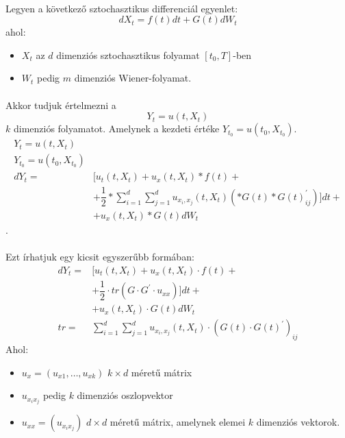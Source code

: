 \documentclass[11pt,a4paper]{article}
\begin{document}
						\paragraph{}
							Legyen a következő sztochasztikus differenciál egyenlet:
							$$d X_t = f(t)dt + G(t) d W_t$$
							ahol:
							\begin{itemize}
								\item $X_t$ az $d$ dimenziós sztochasztikus folyamat $[t_0, T]$-ben
								\item $W_t$ pedig $m$ dimenziós Wiener-folyamat.
							\end{itemize}
						\paragraph{}
							Akkor tudjuk értelmezni a
							$$Y_t = u(t, X_t)$$
							$k$ dimenziós folyamatot. Amelynek a kezdeti értéke $Y_{t_0} =u(t_0,X_{t_0})$.
							$$
							\begin{aligned}
								Y_t = u(t, X_t) \\
								Y_{t_0} =u(t_0,X_{t_0}) \\
								d Y_t = & \bigg[ u_t(t, X_t) + u_x(t,X_t) * f(t) + \\
								&+ \dfrac{1}{2} * \sum_{i=1}^d \sum_{j=1}^d u_{x_i, x_j}(t,X_t)  (*G(t)*G(t)^\prime_{ij})
								\bigg]dt + \\
								&+u_x(t,X_t)*G(t) dW_t
							\end{aligned}
							$$.
						\paragraph{}
							Ezt írhatjuk egy kicsit egyszerűbb formában:
							$$
							\begin{aligned}
								d Y_t = & \bigg[ u_t(t, X_t) + u_x(t,X_t) \cdot f(t) + \\
								&+ \dfrac{1}{2} \cdot tr(G \cdot G^\prime \cdot u_{xx})
								\bigg]dt + \\
								&+u_x(t,X_t) \cdot G(t) dW_t \\
								tr =& \sum_{i=1}^d \sum_{j=1}^d u_{x_i, x_j}(t,X_t)  \cdot (G(t) \cdot G(t)^\prime)_{ij}
							\end{aligned}
							$$
							Ahol:
							\begin{itemize}
								\item $u_x = (u_{x1}, \dots, u_{xk})$ $k \times d$ méretű mátrix
								\item $u_{x_i x_j}$ pedig $k$ dimenziós oszlopvektor
								\item $u_{xx} = (u_{x_i x_j})$ $d \times d$ méretű mátrix, amelynek elemei $k$ dimenziós vektorok.
							\end{itemize}
\end{document}
